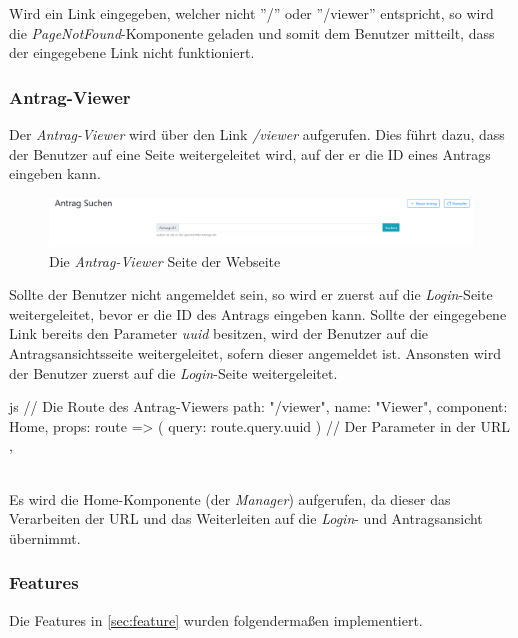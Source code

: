 Wird ein Link eingegeben, welcher nicht ''/'' oder ''/viewer'' entspricht, so wird die \textit{PageNotFound}-Komponente geladen und somit dem Benutzer mitteilt, dass der eingegebene Link nicht funktioniert.
\subsubsection{Antrag-Viewer}
\label{sec:antrag_viewer}
Der \textit{Antrag-Viewer} wird über den Link \textit{/viewer} aufgerufen. Dies führt dazu, dass der Benutzer auf eine Seite weitergeleitet wird, auf der er die ID eines Antrags eingeben kann.
\begin{figure}[H]
	\centering
	\includegraphics[width=1\linewidth]{images/antrag_viewer}
	\caption[Webseite \textit{Antrag-Viewer}]{Die \textit{Antrag-Viewer} Seite der Webseite}
	\label{fig:antragviewer}
\end{figure}

Sollte der Benutzer nicht angemeldet sein, so wird er zuerst auf die \textit{Login}-Seite weitergeleitet, bevor er die ID des Antrags eingeben kann. Sollte der eingegebene Link bereits den Parameter \textit{uuid} besitzen, wird der Benutzer auf die Antragsansichtsseite weitergeleitet, sofern dieser angemeldet ist. Ansonsten wird der Benutzer zuerst auf die \textit{Login}-Seite weitergeleitet.
\begin{code}{js}
	{
		// Die Route des Antrag-Viewers
		path: "/viewer",
		name: "Viewer",
		component: Home,
		props: route => ({ query: route.query.uuid }) // Der Parameter in der URL
	},
\end{code}
~\\
Es wird die Home-Komponente (der \textit{Manager}) aufgerufen, da dieser das Verarbeiten der URL und das Weiterleiten auf die \textit{Login}- und Antragsansicht übernimmt.
\newpage
\subsubsection{Features}
Die Features in \autoref{sec:feature} wurden folgendermaßen implementiert.

